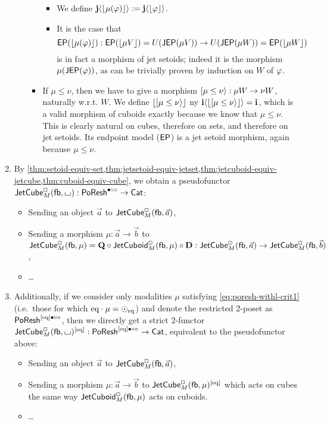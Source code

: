 \documentclass[a4paper]{memoir}
\begin{document}
\begin{definition}
\begin{enumerate}
\begin{itemize}
\begin{itemize}
				\begin{itemize}
					\item We define $\mathbf{j} \langle \mathopen{}\left\lfloor \mu(\varphi) \right\rfloor\mathclose{} \rangle := \mathbf{j} \langle \mathopen{}\left\lfloor \varphi \right\rfloor\mathclose{} \rangle$.
					\item It is the case that
					\[
						\mathsf{EP}(\mathopen{}\left\lfloor \mu(\varphi) \right\rfloor\mathclose{}) : \mathsf{EP}(\mathopen{}\left\lfloor \mu V \right\rfloor\mathclose{}) = U(\mathsf{JEP}(\mu V)) \to U(\mathsf{JEP}(\mu W)) = \mathsf{EP}(\mathopen{}\left\lfloor \mu W \right\rfloor\mathclose{})
					\]
					is in fact a morphism of jet setoids; indeed it is the morphism $\mu(\mathsf{JEP}(\varphi))$, as can be trivially proven by induction on $W$ of $\varphi$.
				\end{itemize}
				\item If $\mu \leq \nu$, then we have to give a morphism $\mathopen{}\left[ \mu \leq \nu \right\rangle\mathclose{} : \mu W \to \nu W$, naturally w.r.t. $W$.
				We define $\mathopen{}\left\lfloor \mathopen{}\left[ \mu \leq \nu \right\rangle\mathclose{} \right\rfloor\mathclose{}$ ny $\mathbf{i} \langle \mathopen{}\left\lfloor \mathopen{}\left[ \mu \leq \nu \right\rangle\mathclose{} \right\rfloor\mathclose{} \rangle = \mathbf{i}$, which is a valid morphism of cuboids exactly because we know that $\mu \leq \nu$.
				This is clearly natural on cubes, therefore on sets, and therefore on jet setoids.
				Its endpoint model ($\mathsf{EP}$) is a jet setoid morphism, again because $\mu \leq \nu$.
			\end{itemize}
		\end{itemize}
		
		\item By \cref{thm:setoid-equiv-set,thm:jetsetoid-equiv-jetset,thm:jetcuboid-equiv-jetcube,thm:cuboid-equiv-cube}, we obtain a pseudofunctor $\mathsf{JetCube}^{\Box}_{M}({\mathsf{fb}},{\llcorner\hspace{-.4ex}\lrcorner}) : \mathsf{PoResh}^{\bullet \circ \circ} \to {\mathsf{Cat}}$:
		\begin{itemize}
			\item Sending an object $\vec a$ to $\mathsf{JetCube}^{\Box}_{M}({\mathsf{fb}},\vec a)$,
			\item Sending a morphism $\mu : \vec a \to \vec b$ to $\mathsf{JetCube}^{\Box}_{M}({\mathsf{fb}},\mu) = {\mathbf{Q}} \circ \mathsf{JetCuboid}^{\Box}_{M}({\mathsf{fb}},\mu) \circ {\mathbf{D}} : \mathsf{JetCube}^{\Box}_{M}({\mathsf{fb}},\vec a) \to \mathsf{JetCube}^{\Box}_{M}({\mathsf{fb}},\vec b)$,
			\item \ldots
		\end{itemize}
		
		\item Additionally, if we consider only modalities $\mu$ satisfying \cref{eq:poresh-withl-crit1} (i.e.\ those for which ${\mathrm{eq}} \cdot \mu = {\odot}_{\mathrm{eq}}$) and denote the restricted 2-poset as $\mathsf{PoResh} ^{[{\mathrm{eq}}]\bullet \circ \circ}$, then we directly get a strict 2-functor $\mathsf{JetCube}^{\Box}_{M}({\mathsf{fb}},{\llcorner\hspace{-.4ex}\lrcorner})^{[{\mathrm{eq}}]} : \mathsf{PoResh} ^{[{\mathrm{eq}}]\bullet \circ \circ} \to {\mathsf{Cat}}$, equivalent to the pseudofunctor above:
		\begin{itemize}
			\item Sending an object $\vec a$ to $\mathsf{JetCube}^{\Box}_{M}({\mathsf{fb}},\vec a)$,
			\item Sending a morphism $\mu : \vec a \to \vec b$ to $\mathsf{JetCube}^{\Box}_{M}({\mathsf{fb}},\mu)^{[{\mathrm{eq}}]}$ which acts on cubes the same way $\mathsf{JetCuboid}^{\Box}_{M}({\mathsf{fb}},\mu)$ acts on cuboids.
			\item \ldots
		\end{itemize}
		

\end{enumerate}
\end{definition}
\end{document}
